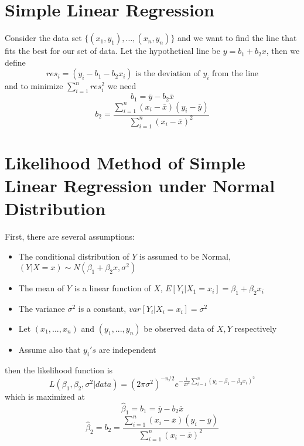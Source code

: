 \documentclass{article}
\begin{document}
\section{Simple Linear Regression}
Consider the data set $\{ (x_1,y_1),\ldots,(x_n,y_n) \}$ and we want to find the line that
fits the best for our set of data. Let the hypothetical line be $y = b_1 + b_2 x$, then we define
\begin{equation*}
    res_i = (y_i - b_1-b_2x_i)\,\,\text{is the deviation of $y_i$ from the line}
\end{equation*}
and to minimize $\sum_{i=1}^nres_i^2$ we need
\begin{equation*}
    b_1 = \overline{y} - b_2\overline{x}
\end{equation*}
\begin{equation*}
    b_2 = \frac{\sum_{i=1}^n(x_i - \overline{x})(y_i-\overline{y})}{\sum_{i=1}^n\left(x_i-\overline{x}\right)^2}
\end{equation*}

\section{Likelihood Method of Simple Linear Regression under Normal Distribution}
First, there are several assumptions:
\begin{itemize}
    \item The conditional distribution of $Y$ is assumed to be Normal, $(Y|X=x)\sim N(\beta_1 + \beta_2x, \sigma^2)$
    \item The mean of $Y$ is a linear function of $X$, $E[Y_i|X_1=x_i] = \beta_1 + \beta_2 x_i$
    \item The variance $\sigma^2$ is a constant, $var[Y_i|X_i=x_i] = \sigma^2$
    \item Let $(x_1,...,x_n)$ and $(y_1,...,y_n)$ be observed data of $X,Y$ respectively
    \item Assume also that $y_i's$ are independent
\end{itemize}
then the likelihood function is
\begin{equation*}
    L(\beta_1,\beta_2,\sigma^2|data) = (2\pi \sigma^2)^{-n/2} e^{-\frac{1}{2\sigma^2}\sum_{i=1}^n(y_i - \beta_1 - \beta_2x_i)^2}
\end{equation*}
which is maximized at
\begin{equation*}
    \hat{\beta}_1 = b_1 = \overline{y} - b_2\overline{x}
\end{equation*}
\begin{equation*}
    \hat{\beta}_2 = b_2 = \frac{\sum_{i=1}^n(x_i - \overline{x})(y_i-\overline{y})}{\sum_{i=1}^n\left(x_i-\overline{x}\right)^2}
\end{equation*}
\end{document}
